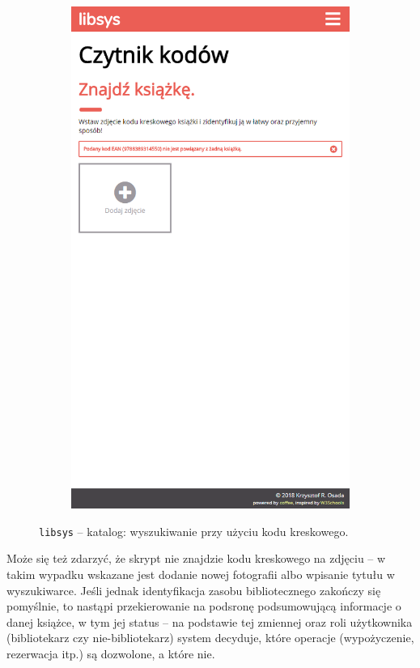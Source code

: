 \documentclass[12pt, a4paper]{article}
\begin{document}
\begin{figure}[h]
\begin{subfigure}{.48\textwidth}
    \includegraphics[width=.75\linewidth]{img/libsys_catalog_4.png}
\end{subfigure}
    \caption{\texttt{libsys} -- katalog: wyszukiwanie przy użyciu kodu kreskowego.}
\end{figure}

Może się też zdarzyć, że skrypt nie znajdzie kodu kreskowego na zdjęciu -- w takim wypadku wskazane jest dodanie nowej fotografii albo wpisanie tytułu w wyszukiwarce. Jeśli jednak identyfikacja zasobu bibliotecznego zakończy się pomyślnie, to nastąpi przekierowanie na podsronę podsumowującą informacje o danej książce, w tym jej status -- na podstawie tej zmiennej oraz roli użytkownika (bibliotekarz czy nie-bibliotekarz) system decyduje, które operacje (wypożyczenie, rezerwacja itp.) są dozwolone, a które nie.
\end{document}
